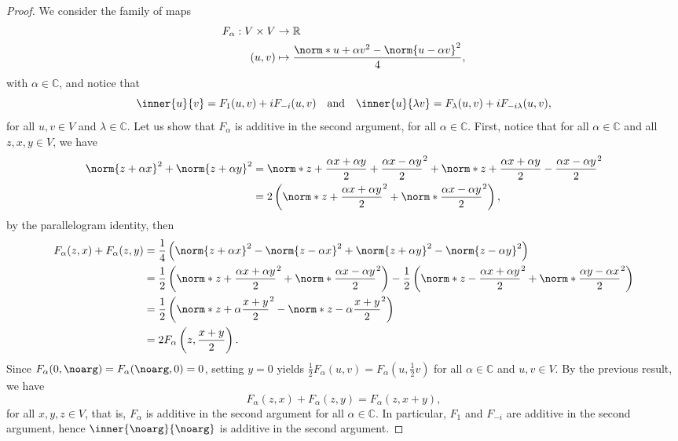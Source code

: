 \begin{proof}
    We consider the family of maps
    \begin{align*}
        F_{\alpha} : V \times V &\to \mathbb{R}\\
        (u,v) &\mapsto \frac{\norm*{u + \alpha v}^2 - \norm{u - \alpha v}^2}{4},
    \end{align*}
    with \(\alpha \in \mathbb{C}\), and notice that
    \begin{equation*}
        \inner{u}{v} = F_{1}(u,v) + iF_{-i}(u,v)\quad\text{and}\quad\inner{u}{\lambda v} = F_{\lambda}(u, v) + i F_{-i \lambda}(u, v),
    \end{equation*}
    for all \(u, v \in V\) and \(\lambda \in \mathbb{C}\). Let us show that \(F_{\alpha}\) is additive in the second argument,
    for all \(\alpha \in \mathbb{C}\). First, notice that for all \(\alpha \in \mathbb{C}\) and all \(z,x,y \in V\), we have
    \begin{align*}
        \norm{z + \alpha x}^2 + \norm{z + \alpha y}^2 &= \norm*{z + \frac{\alpha x + \alpha y}{2} + \frac{\alpha x - \alpha y}{2}}^2 + \norm*{z + \frac{\alpha x + \alpha y}{2} - \frac{\alpha x - \alpha y}{2}}^2\\
                                                      &= 2 \left(\norm*{z + \frac{\alpha x + \alpha y}{2}}^2 + \norm*{\frac{\alpha x - \alpha y}{2}}^2\right),
    \end{align*}
    by the parallelogram identity, then
    \begin{align*}
        F_{\alpha}(z,x) + F_{\alpha}(z,y) &= \frac14\left(\norm{z +\alpha x}^2 - \norm{z - \alpha x}^2 + \norm{z + \alpha y}^2 - \norm{z - \alpha y}^2\right)\\
                                            &=  \frac12\left(\norm*{z + \frac{\alpha x + \alpha y}{2}}^2 + \norm*{\frac{\alpha x - \alpha y}{2}}^2\right) - \frac12 \left(\norm*{z - \frac{\alpha x + \alpha y}{2}}^2 + \norm*{\frac{\alpha y - \alpha x}{2}}^2\right)\\
                                            &= \frac12 \left(\norm*{z + \alpha \frac{x+y}{2}}^2 - \norm*{z - \alpha \frac{x + y}{2}}^2\right)\\
                                            &= 2 F_{\alpha}\left(z, \frac{x + y}{2}\right).
    \end{align*}
    Since \(F_{\alpha}(0, \noarg) = F_{\alpha}(\noarg, 0) = 0\), setting \(y = 0\) yields \(\frac12F_{\alpha}(u, v) = F_{\alpha}(u, \frac12 v)\) for all \(\alpha \in \mathbb{C}\) and \(u, v \in V\). By the previous result, we have
    \begin{equation*}
        F_{\alpha}(z,x) + F_{\alpha}(z,y) = F_{\alpha}(z,x + y),
    \end{equation*}
    for all \(x,y,z \in V\), that is, \(F_{\alpha}\) is additive in the second argument for all \(\alpha \in \mathbb{C}\). In particular, \(F_1\) and \(F_{-i}\) are additive in the second argument, hence \(\inner{\noarg}{\noarg}\) is additive in the second argument.


\end{proof}
